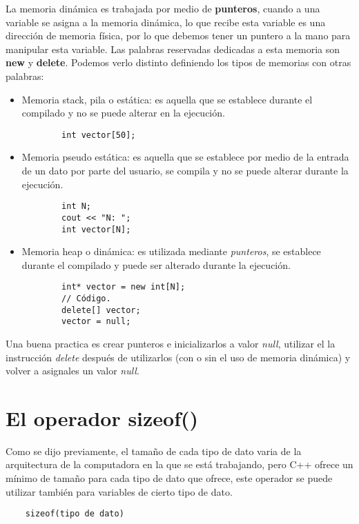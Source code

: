 La memoria dinámica es trabajada por medio de \textbf{punteros}, cuando a una variable se asigna a la memoria dinámica, lo que recibe esta variable es una dirección de memoria física, por lo que debemos tener un puntero a la mano para manipular esta variable. Las palabras reservadas dedicadas a esta memoria son \textbf{new} y \textbf{delete}. Podemos verlo distinto definiendo los tipos de memorias con otras palabras:
\begin{itemize}
    \item Memoria stack, pila o estática: es aquella que se establece durante el compilado y no se puede alterar en la ejecución.
    \begin{lstlisting}
        int vector[50];
    \end{lstlisting}
    \item Memoria pseudo estática: es aquella que se establece por medio de la entrada de un dato por parte del usuario, se compila y no se puede alterar durante la ejecución.
    \begin{lstlisting}
        int N;
        cout << "N: ";
        int vector[N];
    \end{lstlisting}
    \item Memoria heap o dinámica: es utilizada mediante \textit{punteros}, se establece durante el compilado y puede ser alterado durante la ejecución.
    \begin{lstlisting}
        int* vector = new int[N];
        // Código.
        delete[] vector;
        vector = null;
    \end{lstlisting}
\end{itemize}

Una buena practica es crear punteros e inicializarlos a valor \textit{null}, utilizar el la instrucción \textit{delete} después de utilizarlos (con o sin el uso de memoria dinámica) y volver a asignales un valor \textit{null}.



\section{El operador sizeof()}

Como se dijo previamente, el tamaño de cada tipo de dato varia de la arquitectura de la computadora en la que se está trabajando, pero C++ ofrece un mínimo de tamaño para cada tipo de dato que ofrece, este operador se puede utilizar también para variables de cierto tipo de dato.
\begin{lstlisting}
    sizeof(tipo de dato)
\end{lstlisting}

